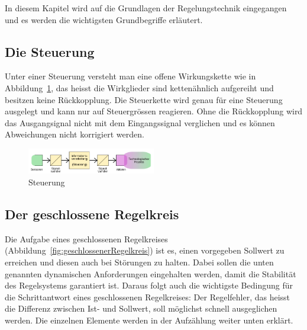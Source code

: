 In diesem Kapitel wird auf die Grundlagen der Regelungstechnik eingegangen und
es werden die wichtigsten Grundbegriffe erl\"autert.

\subsection{Die Steuerung}

Unter  einer   Steuerung  versteht  man   eine  offene Wirkungskette   wie  in
Abbildung~\ref{fig:Steuerung}, das heisst die Wirkglieder sind ketten\"ahnlich
aufgereiht und besitzen keine R\"uckkopplung. Die Steuerkette wird genau f\"ur
eine Steuerung ausgelegt und kann  nur auf Steuergr\"ossen reagieren. Ohne die
R\"uckkopplung wird das Ausgangsignal  nicht mit dem Eingangssignal verglichen
und es k\"onnen Abweichungen nicht korrigiert werden.

\begin{figure}[!h!, width=\pagewidth]
    \centering
    \includegraphics[width=0.5\textwidth]{images/Steuerung}
    \caption{Steuerung}
    \label{fig:Steuerung}
\end{figure}


\subsection{Der geschlossene Regelkreis}
\label{subs:grundl:geschlossenerRegelkreis}
Die          Aufgabe         eines          geschlossenen         Regelkreises
(Abbildung~\ref{fig:geschlossenerRegelkreis})   ist   es,   einen   vorgegeben
Sollwert zu erreichen und diesen auch bei St\"orungen zu halten.  Dabei sollen
die unten  genannten dynamischen  Anforderungen eingehalten werden,  damit die
Stabilit\"at des Regelsystems garantiert ist. Daraus folgt auch die wichtigste
Bedingung  f\"ur  die  Schrittantwort  eines  geschlossenen  Regelkreises: Der
Regelfehler,  das  heisst  die  Differenz zwischen  Ist-  und  Sollwert,  soll
m\"oglichst schnell ausgeglichen werden.  Die einzelnen Elemente werden in der
Aufz\"ahlung weiter unten erkl\"art.


